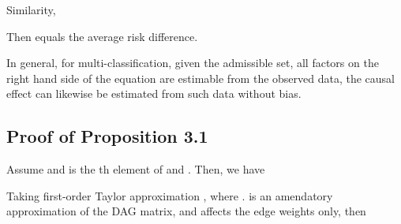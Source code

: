 \documentclass[letterpaper]{article} \usepackage{aaai23}  \usepackage{times}  \usepackage{helvet}  \usepackage{courier}  \usepackage[hyphens]{url}  \usepackage{graphicx} \urlstyle{rm} \def\UrlFont{\rm}  \usepackage{natbib}  \usepackage{caption} \frenchspacing  \setlength{\pdfpagewidth}{8.5in}  \setlength{\pdfpageheight}{11in}  \usepackage{algorithm}
\theoremstyle{plain}
\theoremstyle{definition}
\theoremstyle{remark}
\begin{document}
Similarity,


Then  equals the average risk difference.

In general, for multi-classification, given the admissible set, all factors on the right hand side of the equation are estimable from the observed data, the causal effect can likewise be estimated from such data without bias.


\subsection{Proof of Proposition 3.1 } \label{app:prop1}
Assume  and  is the th element of  and . Then, we have

Taking first-order Taylor approximation , where .  is an amendatory approximation of the DAG matrix, and  affects the edge weights only, then
\end{document}
